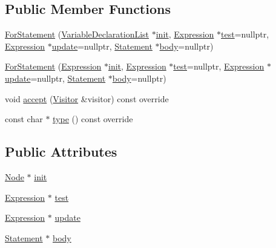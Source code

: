 \subsection*{Public Member Functions}
\begin{DoxyCompactItemize}
\item 
\hyperlink{struct_for_statement_ac6f0bfa1c5a48bcf2ed048639e13cd16}{For\+Statement} (\hyperlink{struct_variable_declaration_list}{Variable\+Declaration\+List} $\ast$\hyperlink{struct_for_statement_aa4516b04bff706f5ad80915357da05e5}{init}, \hyperlink{struct_expression}{Expression} $\ast$\hyperlink{struct_for_statement_a97f163e3d73072eccf4b86120ee17efb}{test}=nullptr, \hyperlink{struct_expression}{Expression} $\ast$\hyperlink{struct_for_statement_ae0e9d64880b5db76426fdb453275fd90}{update}=nullptr, \hyperlink{struct_statement}{Statement} $\ast$\hyperlink{struct_for_statement_a8d9018f1d05bcd027122c9dcabb0e3ba}{body}=nullptr)
\item 
\hyperlink{struct_for_statement_af8cebdc0b96c9bb9bc7df08e273d3f81}{For\+Statement} (\hyperlink{struct_expression}{Expression} $\ast$\hyperlink{struct_for_statement_aa4516b04bff706f5ad80915357da05e5}{init}, \hyperlink{struct_expression}{Expression} $\ast$\hyperlink{struct_for_statement_a97f163e3d73072eccf4b86120ee17efb}{test}=nullptr, \hyperlink{struct_expression}{Expression} $\ast$\hyperlink{struct_for_statement_ae0e9d64880b5db76426fdb453275fd90}{update}=nullptr, \hyperlink{struct_statement}{Statement} $\ast$\hyperlink{struct_for_statement_a8d9018f1d05bcd027122c9dcabb0e3ba}{body}=nullptr)
\item 
void \hyperlink{struct_for_statement_acc3a0ac5de61092f0d7be7921b31d47d}{accept} (\hyperlink{struct_visitor}{Visitor} \&visitor) const override
\item 
const char $\ast$ \hyperlink{struct_for_statement_acf0f64ddd1a41763f15af08813b0bea6}{type} () const override
\end{DoxyCompactItemize}
\subsection*{Public Attributes}
\begin{DoxyCompactItemize}
\item 
\hyperlink{struct_node}{Node} $\ast$ \hyperlink{struct_for_statement_aa4516b04bff706f5ad80915357da05e5}{init}
\item 
\hyperlink{struct_expression}{Expression} $\ast$ \hyperlink{struct_for_statement_a97f163e3d73072eccf4b86120ee17efb}{test}
\item 
\hyperlink{struct_expression}{Expression} $\ast$ \hyperlink{struct_for_statement_ae0e9d64880b5db76426fdb453275fd90}{update}
\item 
\hyperlink{struct_statement}{Statement} $\ast$ \hyperlink{struct_for_statement_a8d9018f1d05bcd027122c9dcabb0e3ba}{body}
\end{DoxyCompactItemize}


